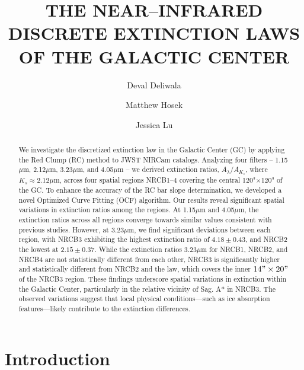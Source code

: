 \documentclass[twocolumn]{aastex631}
\begin{document}
\title{THE NEAR--INFRARED DISCRETE EXTINCTION LAWS OF THE GALACTIC CENTER}

\author{Deval Deliwala}

\author{Matthew Hosek} 

\author{Jessica Lu} 


\begin{abstract}
We investigate the discretized extinction law in the Galactic Center (GC) by
applying the Red Clump (RC) method to JWST NIRCam catalogs. Analyzing four
filters -- 1.15$\mu$m, 2.12$\mu$m, 3.23$\mu$m, and 4.05$\mu$m --
we derived extinction ratios, $ A_\lambda/A_{K_s}$, where $K_s \approx
2.12\mu$m, across four spatial regions NRCB1--4 covering the
central 120"$\times$120" of the GC.  To enhance the accuracy
of the RC bar slope determination,
we developed a novel Optimized Curve Fitting (OCF) algorithm. Our results reveal
significant spatial variations in extinction ratios among the regions. At 1.15$\mu$m 
and 4.05$\mu$m, the extinction ratios across all regions converge
towards similar values consistent with previous studies. However, at 3.23$\mu$m, 
we find significant deviations between each region, with NRCB3 exhibiting the highest
extinction ratio of $4.18 \pm 0.43$, and NRCB2 the lowest at $2.15 \pm 0.37$. 
While the extinction ratios $3.23\mu$m for NRCB1, NRCB2, and NRCB4 are
not statistically different from each other, NRCB3 is
significantly higher and statistically different from NRCB2 and the
\citep{Fritz2011} law, which covers the inner $14"\times 20"$ of the NRCB3 region.
These findings underscore spatial variations in extinction
within the Galactic Center, particularly in the relative vicinity of Sag. A* in
NRCB3. The observed variations suggest that local physical conditions—such as ice
absorption features—likely contribute to the extinction differences.
\end{abstract}

\section{Introduction}
\end{document}

